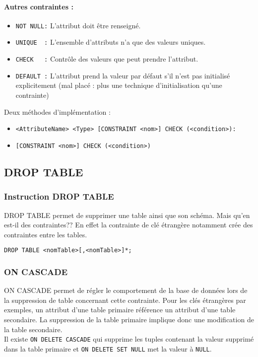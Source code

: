 \documentclass[10pt,a4paper,twoside]{article}
\begin{document}
\paragraph{Autres contraintes :}
\begin{itemize}
\item \verb=NOT NULL:= L'attribut doit être renseigné.
\item \verb=UNIQUE  := L'ensemble d'attributs n'a que des valeurs uniques. 
\item \verb=CHECK   := Contrôle des valeurs que peut prendre l’attribut. 
\item \verb=DEFAULT := L’attribut prend la valeur par défaut s’il n’est pas initialisé explicitement (mal placé : plus une technique d’initialisation qu’une contrainte)
\end{itemize}
Deux méthodes d'implémentation :
\begin{itemize}
\item \verb=<AttributeName> <Type> [CONSTRAINT <nom>] CHECK (<condition>):=
\item \verb=[CONSTRAINT <nom>] CHECK (<condition>)= 
\end{itemize}


\subsection{DROP TABLE}
\subsubsection{Instruction DROP TABLE} 
DROP TABLE permet de supprimer une table ainsi que son schéma. Mais qu'en est-il des contraintes?? En effet la contrainte de clé étrangère notamment crée des contraintes entre les tables.
\begin{verbatim}
DROP TABLE <nomTable>[,<nomTable>]*;
\end{verbatim}

\subsubsection{ON CASCADE} 
ON CASCADE permet de régler le comportement de la base de données lors de la suppression de table concernant cette contrainte. Pour les clés étrangères par exemples, un attribut d'une table primaire référence un attribut d'une table secondaire. La suppression de la table primaire implique donc une modification de la table secondaire.\\
 Il existe \verb=ON DELETE CASCADE= qui supprime les tuples contenant la valeur supprimé dans la table primaire et \verb=ON DELETE SET NULL= met la valeur à \verb=NULL=.
 
\end{document}
